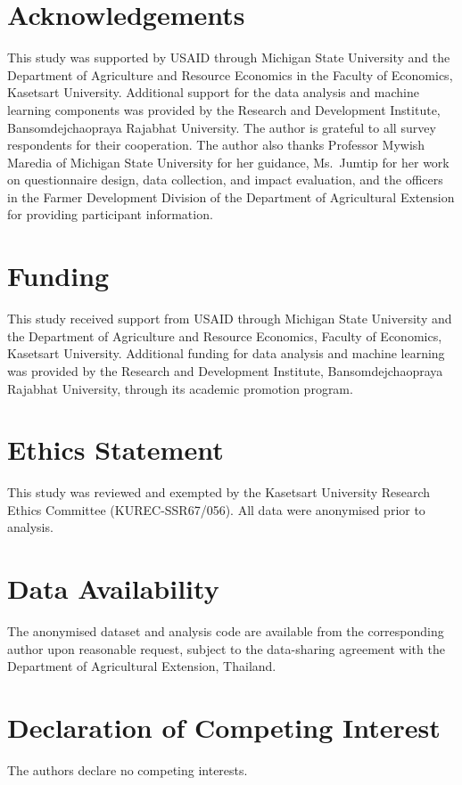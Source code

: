 \documentclass[3p,twocolumn,authoryear]{elsarticle}
\begin{document}
\section*{Acknowledgements}
This study was supported by USAID through Michigan State University and the
Department of Agriculture and Resource Economics in the Faculty of Economics,
Kasetsart University. Additional support for the data analysis and machine
learning components was provided by the Research and Development Institute,
Bansomdejchaopraya Rajabhat University. The author is grateful to all survey
respondents for their cooperation. The author also thanks Professor Mywish
Maredia of Michigan State University for her guidance, Ms.\ Jumtip for her work
on questionnaire design, data collection, and impact evaluation, and the
officers in the Farmer Development Division of the Department of Agricultural
Extension for providing participant information.

\section*{Funding}
This study received support from USAID through Michigan State University and the
Department of Agriculture and Resource Economics, Faculty of Economics,
Kasetsart University. Additional funding for data analysis and machine learning
was provided by the Research and Development Institute, Bansomdejchaopraya
Rajabhat University, through its academic promotion program.

\section*{Ethics Statement}
This study was reviewed and exempted by the Kasetsart University Research Ethics
Committee (KUREC-SSR67/056). All data were anonymised prior to analysis.

\section*{Data Availability}
The anonymised dataset and analysis code are available from the corresponding
author upon reasonable request, subject to the data-sharing agreement with the
Department of Agricultural Extension, Thailand.

\section*{Declaration of Competing Interest}
The authors declare no competing interests.
\end{document}
